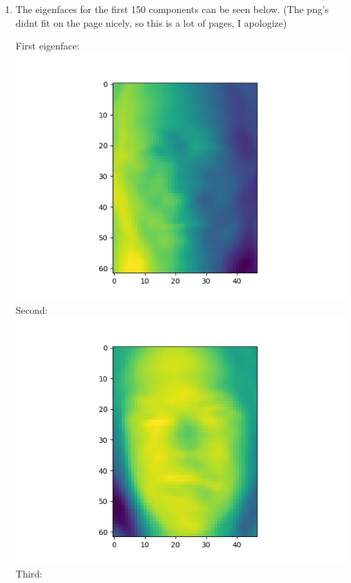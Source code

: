 \documentclass[twoside,10pt]{article}
\theoremstyle{definition}
\theoremstyle{definition}
\theoremstyle{remark}
\renewcommand{\>}{{\rightarrow}}
\newcommand{\1}{{\mathbf 1}}
\newcommand{\0}{{\mathbf 0}}
\begin{document}
\begin{enumerate}
\begin{enumerate}
  \end{enumerate}

    
   
\item
  The eigenfaces for the first 150 components can be seen below. (The png's didnt fit on the page nicely, so this is a lot of pages, I apologize)

  First eigenface:
  \includegraphics[width=\textwidth]{eigenface_1.png}
  Second:
  \includegraphics[width=\textwidth]{eigenface_2.png}
  Third:

\end{enumerate}
\end{document}
